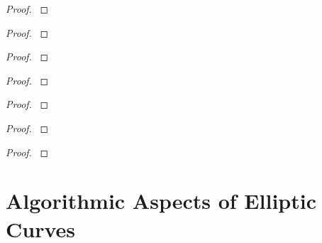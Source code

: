 \documentclass[12pt,reqno]{amsart}
\begin{document}
\begin{exe}\label{10.18}

\begin{proof}\label{s10.18}

\end{proof} 
\end{exe} 

\begin{exe}\label{10.19}

\begin{proof}\label{s10.19}

\end{proof} 
\end{exe} 

\begin{exe}\label{10.20}

\begin{proof}\label{s10.20}

\end{proof} 
\end{exe} 

\begin{exe}\label{10.21}

\begin{proof}\label{s10.21}

\end{proof} 
\end{exe} 

\begin{exe}\label{10.22}

\begin{proof}\label{s10.22}

\end{proof} 
\end{exe} 

\begin{exe}\label{10.23}

\begin{proof}\label{s10.23}

\end{proof} 
\end{exe} 

\begin{exe}\label{10.24}

\begin{proof}\label{s10.24}

\end{proof} 
\end{exe} 

\newpage
\section{Algorithmic Aspects of Elliptic Curves}\label{11}
\end{document}
